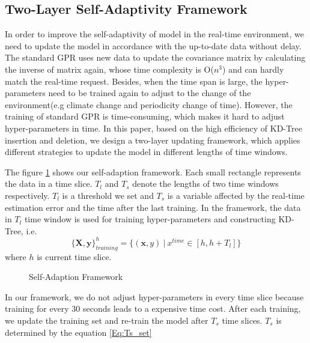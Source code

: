\documentclass[twoside,leqno,twocolumn]{article}
\begin{document}
\subsection{Two-Layer Self-Adaptivity Framework}
In order to improve the self-adaptivity of model in the real-time environment, we need to update the model in accordance with the up-to-date data without delay. The standard GPR uses new data to update the covariance matrix by calculating the inverse of matrix again, whose time complexity is O($n^3$) and can hardly match the real-time request. Besides, when the time span is large, the hyper-parameters need to be trained again to adjust to the change of the environment(e.g climate change and periodicity change of time). However, the training of standard GPR is time-consuming, which makes it hard to adjust hyper-parameters in time. In this paper, based on the high efficiency of KD-Tree insertion and deletion, we design a two-layer updating framework, which applies different strategies to update the model in different lengths of time windows.

The figure \ref{fig:AF} shows our self-adaption framework. Each small rectangle represents the data in a time slice. $T_l$ and $T_s$ denote the lengths of two time windows respectively. $T_l$ is a threshold we set and $T_s$ is a variable affected by the real-time estimation error and the time after the last training. In the framework, the data in $T_l$ time window is used for training hyper-parameters and constructing KD-Tree, i.e.
\begin{equation}
	\{\bm{X}, \bm{y}\}_{training}^h = \{(\bm{x}, y)~|~ x^{time} \in [h, h + T_l] \}
\end{equation}
where $h$ is current time slice.
\begin{figure}[htbp]
\small
{}

\caption{Self-Adaption Framework}
\label{fig:AF}
\end{figure}

In our framework, we do not adjust hyper-parameters in every time slice because training for every 30 seconds leads to a expensive time cost. After each training, we update the training set and re-train the model after $T_s$ time slices. $T_s$ is determined by the equation \ref{Eq:Ts_set}
\end{document}
